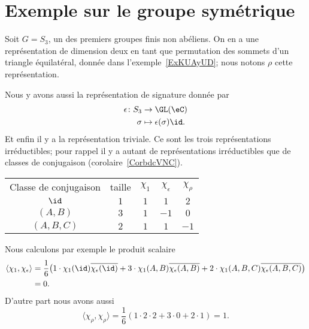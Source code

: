 \section{Exemple sur le groupe symétrique}

Soit \( G=S_3\), un des premiers groupes finis non abéliens. On en a une représentation de dimension deux en tant que permutation des sommets d'un triangle équilatéral, donnée dans l'exemple~\ref{ExKUAyUD}; nous notons \( \rho\) cette représentation.

Nous y avons aussi la représentation de signature donnée par
\begin{equation}
	\begin{aligned}
		\epsilon\colon S_3 & \to \GL(\eC)                 \\
		\sigma             & \mapsto \epsilon(\sigma)\id.
	\end{aligned}
\end{equation}
Et enfin il y a la représentation triviale. Ce sont les trois représentations irréductibles; pour rappel il y a autant de représentations irréductibles que de classes de conjugaison (corolaire~\ref{CorbdcVNC}).

\begin{center}
	\begin{tabular}[]{ccccc}
		Classe de conjugaison & taille & \( \chi_1\) & \( \chi_{\epsilon}\) & \( \chi_{\rho}\) \\
		\( \id\)                 & \( 1\)    & \( 1\)         & \( 1\)                  & \( 2\)           \\
		\( (A,B)\)            & \( 3\)    & \( 1\)         & \( -1\)                 & \( 0\)           \\
		\( (A,B,C)\)          & \( 2\) & \( 1\)      & \( 1\)               & \( -1\)          \\
	\end{tabular}
\end{center}

Nous calculons par exemple le produit scalaire
\begin{subequations}
	\begin{align}
		\langle \chi_1, \chi_{\epsilon}\rangle & =\frac{1}{ 6 }\big( 1\cdot\chi_1(\id)\overline{ \chi_{\epsilon}(\id) }+3\cdot \chi_1(A,B)\overline{ \chi_{\epsilon}(A,B) }+2\cdot \chi_1(A,B,C)\overline{ \chi_{\epsilon}(A,B,C) } \big) \\
		                                       & =0.
	\end{align}
\end{subequations}
D'autre part nous avons aussi
\begin{equation}
	\langle \chi_{\rho}, \chi_{\rho}\rangle =\frac{1}{ 6 }(1\cdot2\cdot 2+3\cdot 0+2\cdot 1)=1.
\end{equation}

